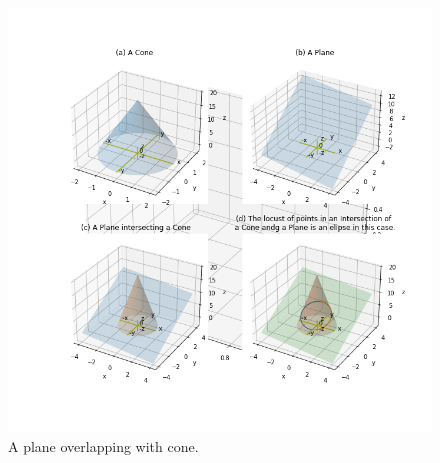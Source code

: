 \documentclass[10pt,a4paper,leqno]{article}
\begin{document}
\begin{CJK*}{UTF8}{gbsn}
\begin{figure}[H]
\centering\includegraphics[width=1\linewidth,height=0.7\textheight]{Data/fgr02.png}
\caption{A plane overlapping with cone.}
\label{fig:Data/fgr02.png}
\end{figure}


\end{CJK*}
\end{document}
